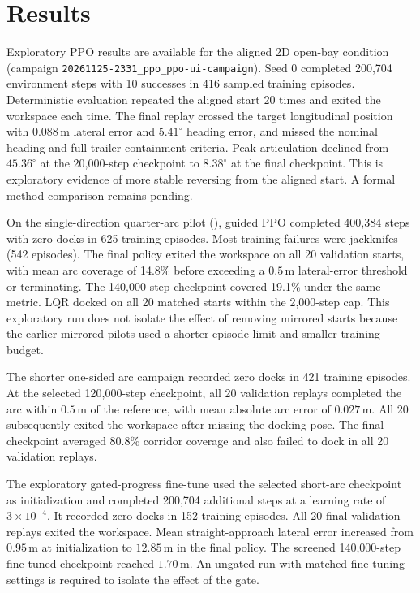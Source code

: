 \section{Results}

Exploratory PPO results are available for the aligned 2D open-bay condition
(campaign \texttt{20261125-2331\_ppo\_ppo-ui-campaign}). Seed 0 completed
200,704 environment steps with 10 successes in 416 sampled training episodes.
Deterministic evaluation repeated the aligned start 20 times and exited the
workspace each time. The final replay crossed the target longitudinal
position with $0.088\,\mathrm{m}$ lateral error and $5.41^\circ$ heading
error, and missed the nominal heading and full-trailer containment criteria.
Peak articulation declined from $45.36^\circ$ at the 20,000-step checkpoint to
$8.38^\circ$ at the final checkpoint. This is exploratory evidence of more
stable reversing from the aligned start. A formal method comparison remains
pending.

On the single-direction quarter-arc pilot
(), guided PPO
completed 400,384 steps with zero docks in 625 training episodes.
Most training failures were jackknifes (542 episodes). The final policy
exited the workspace on all 20 validation starts, with mean arc coverage
of 14.8\% before exceeding a $0.5\,\mathrm{m}$ lateral-error threshold
or terminating. The 140,000-step checkpoint covered 19.1\% under the
same metric. LQR docked on all 20 matched starts within the 2,000-step
cap. This exploratory run does not isolate the effect
of removing mirrored starts because the earlier mirrored pilots used
a shorter episode limit and smaller training budget.

The shorter one-sided arc campaign
 recorded zero docks in 421
training episodes. At the selected 120,000-step checkpoint, all 20
validation replays completed the arc within $0.5\,\mathrm{m}$ of the
reference, with mean absolute arc error of $0.027\,\mathrm{m}$. All
20 subsequently exited the workspace after missing the docking pose.
The final checkpoint averaged 80.8\% corridor coverage and also failed
to dock in all 20 validation replays.

The exploratory gated-progress fine-tune
 used the selected short-arc
checkpoint as initialization and completed 200,704 additional steps
at a learning rate of $3\times10^{-4}$. It recorded zero docks in 152
training episodes. All 20 final validation replays exited the workspace.
Mean straight-approach lateral error increased from $0.95\,\mathrm{m}$
at initialization to $12.85\,\mathrm{m}$ in the final policy. The
screened 140,000-step fine-tuned checkpoint reached $1.70\,\mathrm{m}$.
An ungated run with matched fine-tuning settings is required to isolate
the effect of the gate.

